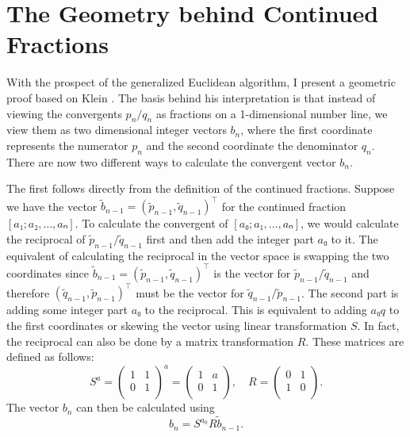 \section{The Geometry behind Continued Fractions}

With the prospect of the generalized Euclidean algorithm, I present a geometric
proof based on Klein \cite{Klein95}.
The basis behind his interpretation is that instead of viewing the convergents
$p_n/q_n$ as fractions on a 1-dimensional number line,
we view them as two dimensional integer vectors $b_n$, where the first
coordinate represents the numerator $p_n$ and the second coordinate the
denominator $q_n$.
There are now two different ways to calculate the convergent vector $b_n$.

The first follows directly from the definition of the continued fractions.
Suppose we have the vector $\tilde b_{n-1} = (\tilde p_{n-1}, \tilde q_{n-1})^⊤$
for the continued fraction $[a₁; a₂, …, aₙ]$.
To calculate the convergent of $[a₀; a₁, …, aₙ]$,
we would calculate the reciprocal of $\tilde p_{n-1} / \tilde q_{n-1}$ first
and then add the integer part $a₀$ to it.
The equivalent of calculating the reciprocal in the vector space is swapping the two coordinates
since $\tilde b_{n-1} = (\tilde p_{n-1}, \tilde q_{n-1})^⊤$ is the vector for $\tilde p_{n-1} / \tilde q_{n-1}$
and therefore $(\tilde q_{n-1}, \tilde p_{n-1})^⊤$ must be the vector for $\tilde q_{n-1} / \tilde p_{n-1}$.
The second part is adding some integer part $a₀$ to the reciprocal.
This is equivalent to adding $a₀ q$ to the first coordinates
or skewing the vector using linear transformation $S$.
In fact, the reciprocal can also be done by a matrix transformation $R$.
These matrices are defined as follows:
\[
  S^a =
  \begin{pmatrix}
    1 & 1 \\
    0 & 1 \\
  \end{pmatrix}^a
  =
  \begin{pmatrix}
    1 & a \\
    0 & 1 \\
  \end{pmatrix},
  \quad
  R =
  \begin{pmatrix}
    0 & 1 \\
    1 & 0 \\
  \end{pmatrix}.
\]
The vector $b_n$ can then be calculated using
\[
  b_n = S^{a_0} R \tilde b_{n-1}.
\]

